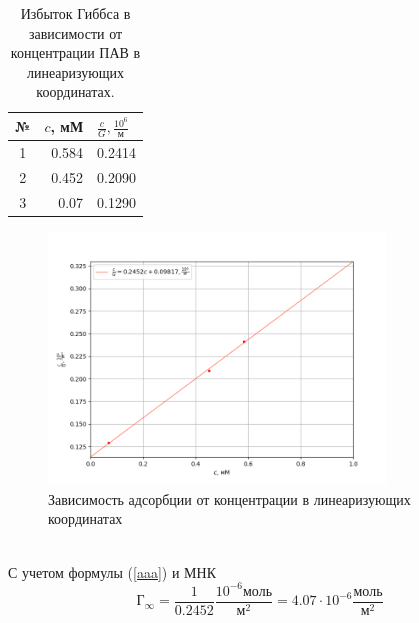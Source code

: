 \documentclass[a4paper,12pt]{article}
\begin{document}
\begin{enumerate}
\begin{table}[h!]
\centering
\begin{tabular}{|c|r|r|}
\hline
№ & \multicolumn{1}{l|}{$c$, мМ} & \multicolumn{1}{l|}{$\frac{c}{G}, \frac{10^{6} }{м}$} \\ \hline
1 & 0.584                        & 0.2414                                                \\ \hline
2 & 0.452                        & 0.2090                                                \\ \hline
3 & 0.07                         & 0.1290                                                \\ \hline
\end{tabular}
\caption{Избыток Гиббса в зависимости от концентрации ПАВ в линеаризующих координатах.}
\label{tab:my-table}
\end{table}


\newpage
\begin{figure}[h!]
    \centering
    \includegraphics[width = 0.8\textwidth]{c_G_line_end.png}
    \caption{Зависимость адсорбции от концентрации в линеаризующих координатах}
\end{figure}\\

С учетом формулы (\ref{aaa}) и МНК
\begin{equation*}
    \text{Г}_{\infty} = \frac{1}{0.2452}\frac{10^{-6}\text{моль}}{\text{м}^2} = 4.07\cdot 10^{-6}\frac{\text{моль}}{\text{м}^2}
\end{equation*}


\end{enumerate}
\end{document}
